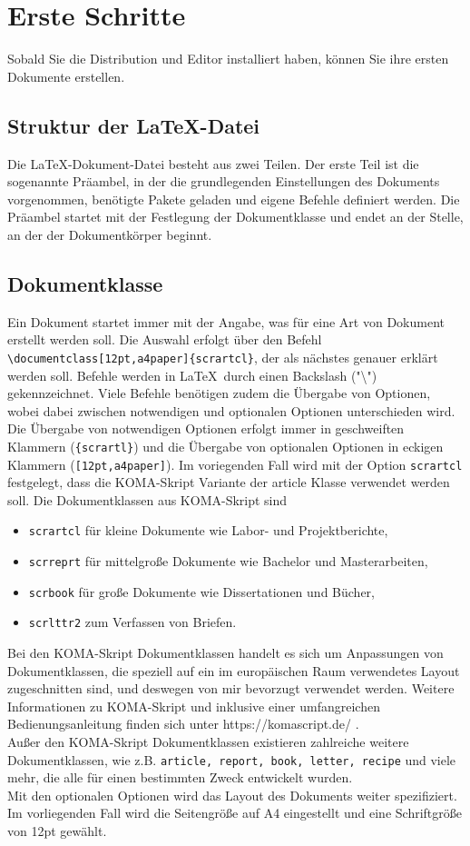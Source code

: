 \documentclass[12pt,a4paper]{scrartcl}
\begin{document}
\section{Erste Schritte}
%
Sobald Sie die Distribution und Editor installiert haben, können Sie ihre ersten Dokumente erstellen. 
%
\subsection{Struktur der \LaTeX-Datei}
%
Die \LaTeX-Dokument-Datei besteht aus zwei Teilen. 
Der erste Teil ist die sogenannte Präambel, in der die grundlegenden Einstellungen des Dokuments vorgenommen, benötigte Pakete geladen und eigene Befehle definiert werden.
Die Präambel startet mit der Festlegung der Dokumentklasse und endet an der Stelle, an der der Dokumentkörper beginnt. 
%
\subsection{Dokumentklasse}
%
Ein Dokument startet immer mit der Angabe, was für eine Art von Dokument erstellt werden soll. 
Die Auswahl erfolgt über den Befehl \texttt{\textbackslash documentclass[12pt,a4paper]\{scrartcl\}}, der als nächstes genauer erklärt werden soll.
Befehle werden in \LaTeX\, durch einen Backslash ("\textbackslash") gekennzeichnet.
Viele Befehle benötigen zudem die Übergabe von Optionen, wobei dabei zwischen notwendigen und optionalen Optionen unterschieden wird. 
Die Übergabe von notwendigen Optionen erfolgt immer in geschweiften Klammern (\texttt{\{scrartl\}}) und die Übergabe von optionalen Optionen in eckigen Klammern (\texttt{[12pt,a4paper]}).
Im voriegenden Fall wird mit der Option \texttt{scrartcl} festgelegt, dass die KOMA-Skript Variante der article Klasse verwendet werden soll. 
Die Dokumentklassen aus KOMA-Skript sind 
%
\begin{itemize}
\item \texttt{scrartcl} für kleine Dokumente wie Labor- und Projektberichte,
\item \texttt{scrreprt} für mittelgroße Dokumente wie Bachelor und Masterarbeiten,
\item \texttt{scrbook} für große Dokumente wie Dissertationen und Bücher,
\item \texttt{scrlttr2} zum Verfassen von Briefen.
\end{itemize}
%
Bei den KOMA-Skript Dokumentklassen handelt es sich um Anpassungen von Dokumentklassen, die speziell auf ein im europäischen Raum verwendetes Layout zugeschnitten sind, und deswegen von mir bevorzugt verwendet werden. Weitere Informationen zu KOMA-Skript und inklusive einer umfangreichen Bedienungsanleitung finden sich unter https://komascript.de/ .
\\
Außer den KOMA-Skript Dokumentklassen existieren zahlreiche weitere Dokumentklassen, wie z.B.
\texttt{article, report, book, letter, recipe} und viele mehr, die alle für einen bestimmten Zweck entwickelt wurden.
\\
Mit den optionalen Optionen wird das Layout des Dokuments weiter spezifiziert.
Im vorliegenden Fall wird die Seitengröße auf A4 eingestellt und eine Schriftgröße von 12pt gewählt.
%
\end{document}
